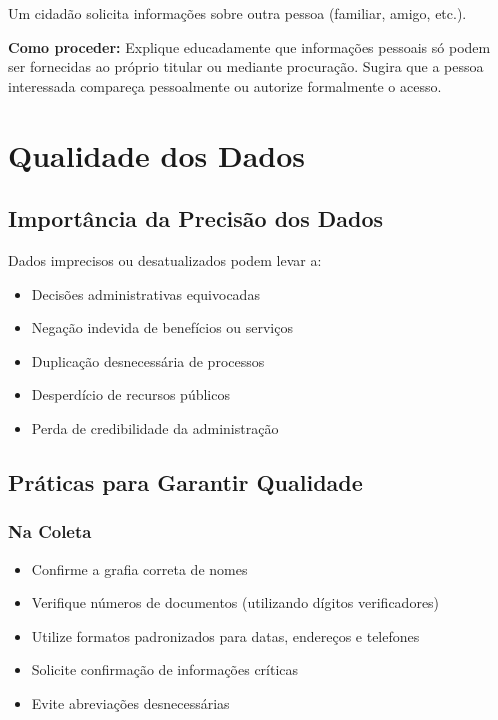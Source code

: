 \documentclass[12pt,a4paper]{article}
\begin{document}
\begin{tcolorbox}[colback=azulclaro, colframe=blue!75!black, title=Situação Comum]
Um cidadão solicita informações sobre outra pessoa (familiar, amigo, etc.).

\textbf{Como proceder:} Explique educadamente que informações pessoais só podem ser fornecidas ao próprio titular ou mediante procuração. Sugira que a pessoa interessada compareça pessoalmente ou autorize formalmente o acesso.
\end{tcolorbox}

\newpage
\section{Qualidade dos Dados}

\subsection{Importância da Precisão dos Dados}
Dados imprecisos ou desatualizados podem levar a:
\begin{itemize}
    \item Decisões administrativas equivocadas
    \item Negação indevida de benefícios ou serviços
    \item Duplicação desnecessária de processos
    \item Desperdício de recursos públicos
    \item Perda de credibilidade da administração
\end{itemize}

\subsection{Práticas para Garantir Qualidade}

\subsubsection{Na Coleta}
\begin{itemize}
    \item Confirme a grafia correta de nomes
    \item Verifique números de documentos (utilizando dígitos verificadores)
    \item Utilize formatos padronizados para datas, endereços e telefones
    \item Solicite confirmação de informações críticas
    \item Evite abreviações desnecessárias
\end{itemize}
\end{document}
